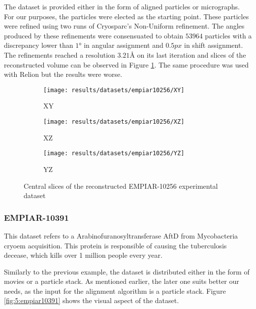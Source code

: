 \documentclass[../main.tex]{subfiles}
\begin{document}
The dataset is provided either in the form of aligned particles or micrographs. For our purposes, the particles were elected as the starting point. These particles were refined using two runs of Cryosparc's Non-Uniform refinement. The angles produced by these refinements were consensuated to obtain $53964$ particles with a discrepancy lower than $1 \si{\degree}$ in angular assignment and $0.5 \si{px}$ in shift assignment. The refinements reached a resolution $3.21 \si{\angstrom}$ on its last iteration and slices of the reconstructed volume can be observed in Figure \ref{fig:5:empiar10256_rec}. The same procedure was used with Relion but the results were worse.

\begin{figure}[htbp]
    \centering
    \begin{subfigure}[b]{0.3\textwidth}
         \centering
         \texttt{[image: results/datasets/empiar10256/XY]}
         \caption{XY}
    \end{subfigure}
    \hfill
    \begin{subfigure}[b]{0.3\textwidth}
         \centering
         \texttt{[image: results/datasets/empiar10256/XZ]}
         \caption{XZ}
    \end{subfigure}
    \hfill
    \begin{subfigure}[b]{0.3\textwidth}
         \centering
         \texttt{[image: results/datasets/empiar10256/YZ]}
         \caption{YZ}
    \end{subfigure}

    \caption{Central slices of the reconstructed EMPIAR-10256 experimental dataset}
    \label{fig:5:empiar10256_rec}
\end{figure}

\subsubsection{EMPIAR-10391}
This dataset refers to a Arabinofuranosyltransferase AftD from Mycobacteria \gls{cryoem} acquisition. This protein is responsible of causing the tuberculosis decease, which kills over 1 million people every year\cite{tan2020}\cite{empiar10391}.

Similarly to the previous example, the dataset is distributed either in the form of movies or a particle stack. As mentioned earlier, the later one suits better our needs, as the input for the alignment algorithm is a particle stack. Figure \ref{fig:5:empiar10391} shows the visual aspect of the dataset. 
\end{document}
